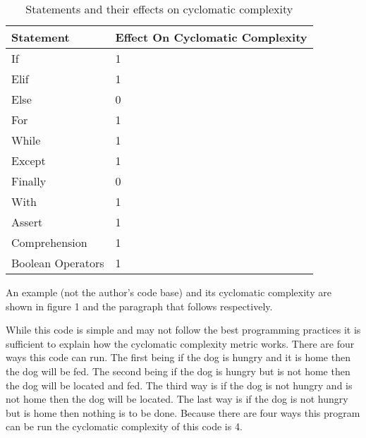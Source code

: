 \documentclass[11pt,journal, a4paper]{IEEEtran}
\begin{document}
\begin{table}[H]
\centering
\caption{Statements and their effects on cyclomatic complexity}
\label{my-label}
\begin{tabular}{|l|l|}
\hline
Statement         & Effect On Cyclomatic Complexity \\ \hline
If                & 1                               \\ \hline
Elif              & 1                               \\ \hline
Else              & 0                               \\ \hline
For               & 1                               \\ \hline
While             & 1                               \\ \hline
Except            & 1                               \\ \hline
Finally           & 0                               \\ \hline
With              & 1                               \\ \hline
Assert            & 1                               \\ \hline
Comprehension     & 1                               \\ \hline
Boolean Operators & 1                               \\ \hline
\end{tabular}
\end{table}

\noindent
An example (not the author's code base) and its cyclomatic complexity are shown in figure 1 and the paragraph that follows respectively. 




\noindent
While this code is simple and may not follow the best programming practices it is sufficient to explain how the cyclomatic complexity metric works. There are four ways this code can run. The first being if the dog is hungry and it is home then the dog will be fed. The second being if the dog is hungry but is not home then the dog will be located and fed. The third way is if the dog is not hungry and is not home then the dog will be located. The last way is if the dog is not hungry but is home then nothing is to be done. Because there are four ways this program can be run the cyclomatic complexity of this code is 4.\\  
\end{document}
